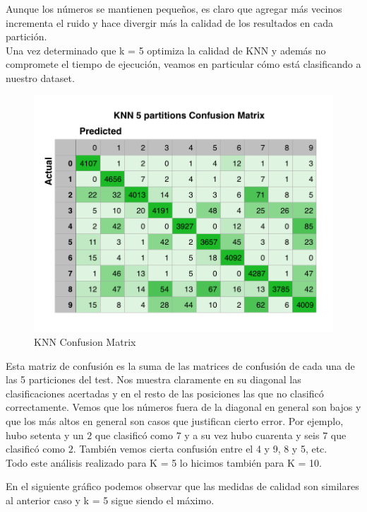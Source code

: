 Aunque los números se mantienen pequeños, es claro que agregar más vecinos incrementa el ruido y hace divergir más la calidad de los resultados en cada partición.\\

Una vez determinado que k = 5 optimiza la calidad de KNN y además no compromete el tiempo de ejecución, veamos en particular cómo está clasificando a nuestro dataset.


\begin{figure}[h!]
  \begin{center}
	\includegraphics[scale=0.7]{exp1/KNN-5p-Confusion.png}
	\caption{KNN Confusion Matrix}
  \end{center}
\end{figure}

Esta matriz de confusión es la suma de las matrices de confusión de cada una de las 5 particiones del test. Nos muestra claramente en su diagonal las clasificaciones acertadas y en el resto de las posiciones las que no clasificó correctamente. Vemos que los números fuera de la diagonal en general son bajos y que los más altos en general son casos que justifican cierto error. Por ejemplo, hubo setenta y un $2$ que clasificó como $7$ y a su vez hubo cuarenta y seis $7$ que clasificó como $2$. También vemos cierta confusión entre el 4 y 9, 8 y 5, etc.\\ 


Todo este análisis realizado para K = 5 lo hicimos también para K = 10. 

En el siguiente gráfico podemos observar que las medidas de calidad son similares al anterior caso y k = 5 sigue siendo el máximo.\\


